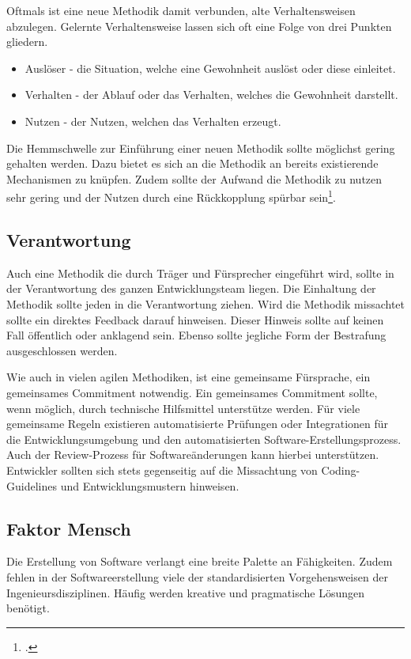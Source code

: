 Oftmals ist eine neue Methodik damit verbunden, alte Verhaltensweisen abzulegen.
Gelernte Verhaltensweise lassen sich oft eine Folge von drei Punkten gliedern.
\begin{itemize}
\item Auslöser - die Situation, welche eine Gewohnheit auslöst oder diese einleitet.
\item Verhalten - der Ablauf oder das Verhalten, welches die Gewohnheit darstellt.
\item Nutzen - der Nutzen, welchen das Verhalten erzeugt.
\end{itemize}
Die Hemmschwelle zur Einführung einer neuen Methodik sollte möglichst gering gehalten werden. Dazu bietet es sich an die Methodik an bereits existierende Mechanismen zu knüpfen. Zudem sollte der Aufwand die Methodik zu nutzen sehr gering und der Nutzen durch eine Rückkopplung spürbar sein\footcite[vgl.][]{steps-of-habit}.

\subsection{Verantwortung}

Auch eine Methodik die durch Träger und Fürsprecher eingeführt wird, sollte in der Verantwortung des ganzen Entwicklungsteam liegen. Die Einhaltung der Methodik sollte jeden in die Verantwortung ziehen. Wird die Methodik missachtet sollte ein direktes Feedback darauf hinweisen. Dieser Hinweis sollte auf keinen Fall öffentlich oder anklagend sein. Ebenso sollte jegliche Form der Bestrafung ausgeschlossen werden.

Wie auch in vielen agilen Methodiken, ist eine gemeinsame Fürsprache, ein gemeinsames \glqq \gls{Commitment}\grqq{} notwendig. Ein gemeinsames Commitment sollte, wenn möglich, durch technische Hilfsmittel unterstütze werden. Für viele gemeinsame Regeln existieren automatisierte Prüfungen oder Integrationen für die Entwicklungsumgebung und den automatisierten Software-Erstellungsprozess.
Auch der Review-Prozess für Softwareänderungen kann hierbei unterstützen. Entwickler sollten sich stets gegenseitig auf die Missachtung von Coding-Guidelines und Entwicklungsmustern hinweisen.

\subsection{Faktor Mensch}

Die Erstellung von Software verlangt eine breite Palette an Fähigkeiten. Zudem fehlen in der Softwareerstellung viele der standardisierten Vorgehensweisen der Ingenieursdisziplinen. Häufig werden kreative und pragmatische Lösungen benötigt.

